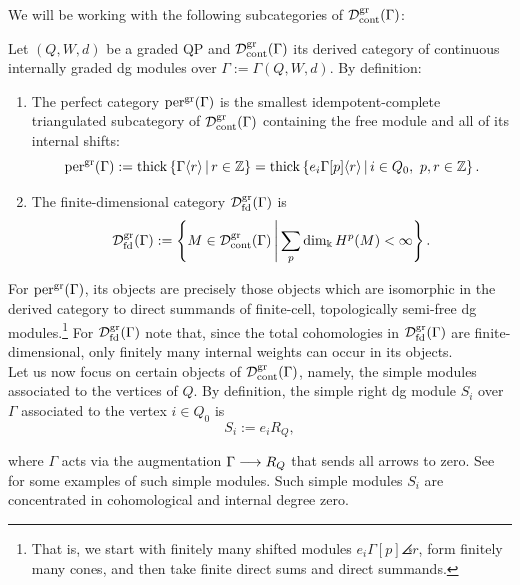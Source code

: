 We will be working with the following subcategories of $\mathcal D^{\mathrm{gr}}_{\mathrm{cont}}(\Gamma)$:

\begin{definition}\label{def:categories_over_bigraded}
Let $(Q,W,d)$ be a graded QP and $\mathcal D^{\mathrm{gr}}_{\mathrm{cont}}(\Gamma)$ its derived category of continuous internally graded dg modules over $\Gamma:=\Gamma(Q,W,d)$. By definition:

\begin{enumerate}
    \item The perfect category $\operatorname{per}^{\mathrm{gr}}(\Gamma)$ is the smallest idempotent-complete triangulated subcategory of $\mathcal D^{\mathrm{gr}}_{\mathrm{cont}}(\Gamma)$ containing the free module and all of its internal shifts:
\begin{equation}\label{eq:perfect-category}
  \operatorname{per}^{\mathrm{gr}}(\Gamma)
  :=\operatorname{thick}\left\{\Gamma\langle r\rangle\,\middle|\, r\in\mathbb Z\right\}
  =\operatorname{thick}\left\{e_i\Gamma[p]\langle r\rangle
      \,\middle|\, i\in Q_0,\ p,r\in\mathbb Z\right\}.
\end{equation}

\item The finite-dimensional category $\mathcal D^{\mathrm{gr}}_{\mathrm{fd}}(\Gamma)$ is
\[
  \mathcal D^{\mathrm{gr}}_{\mathrm{fd}}(\Gamma)
  :=\left\{M\in\mathcal D^{\mathrm{gr}}_{\mathrm{cont}}(\Gamma)\,\middle|\,
  \sum_p\dim_\Bbbk H^p(M)<\infty\right\}.
\]
\end{enumerate}
\end{definition}

For $\operatorname{per}^{\mathrm{gr}}(\Gamma)$, its objects are precisely those objects which are isomorphic in the derived category to direct summands of finite-cell, topologically semi-free dg modules.\footnote{That is, we start with finitely many shifted modules $e_i\Gamma[p]\angles r$, form finitely many cones, and then take finite direct sums and direct summands.} For $\mathcal D^{\mathrm{gr}}_{\mathrm{fd}}(\Gamma)$ note that, since the total cohomologies in $\mathcal D^{\mathrm{gr}}_{\mathrm{fd}}(\Gamma)$ are finite-dimensional, only finitely many internal weights can occur in its objects.\\

Let us now focus on certain objects of $\mathcal D^{\mathrm{gr}}_{\mathrm{cont}}(\Gamma)$, namely, the simple modules associated to the vertices of $Q$. By definition, the simple right dg module $S_i$ over $\Gamma$ associated to the vertex $i\in Q_0$ is
\begin{equation}\label{eq:Si}
  S_i:=e_iR_Q,
\end{equation}

\noindent where $\Gamma$ acts via the augmentation $\Gamma\longrightarrow R_Q$ that sends all arrows to zero. See  for some examples of such simple modules. Such simple modules $S_i$ are concentrated in cohomological and internal degree zero.

